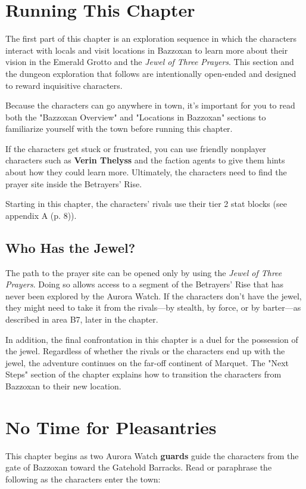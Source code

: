 \documentclass[letterpaper, 11pt, bg=full, twocolumn]{dndbook}
\begin{document}
\section{Running This Chapter}

The first part of this chapter is an exploration sequence in which the characters interact with locals and visit locations in Bazzoxan to learn more about their vision in the Emerald Grotto and the \textit{Jewel of Three Prayers}. This section and the dungeon exploration that follows are intentionally open-ended and designed to reward inquisitive characters.

Because the characters can go anywhere in town, it's important for you to read both the "Bazzoxan Overview" and "Locations in Bazzoxan" sections to familiarize yourself with the town before running this chapter.

If the characters get stuck or frustrated, you can use friendly nonplayer characters such as \textbf{Verin Thelyss} and the faction agents to give them hints about how they could learn more. Ultimately, the characters need to find the prayer site inside the Betrayers' Rise.

Starting in this chapter, the characters' rivals use their tier 2 stat blocks (see appendix A (p. 8)).

\subsection{Who Has the Jewel?}

The path to the prayer site can be opened only by using the \textit{Jewel of Three Prayers}. Doing so allows access to a segment of the Betrayers' Rise that has never been explored by the Aurora Watch. If the characters don't have the jewel, they might need to take it from the rivals---by stealth, by force, or by barter---as described in area B7, later in the chapter.

In addition, the final confrontation in this chapter is a duel for the possession of the jewel. Regardless of whether the rivals or the characters end up with the jewel, the adventure continues on the far-off continent of Marquet. The "Next Steps" section of the chapter explains how to transition the characters from Bazzoxan to their new location.
\section{No Time for Pleasantries}

This chapter begins as two Aurora Watch \textbf{guards} guide the characters from the gate of Bazzoxan toward the Gatehold Barracks. Read or paraphrase the following as the characters enter the town:
\end{document}
